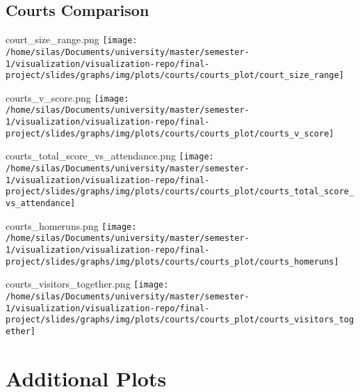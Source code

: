 \documentclass[pdf]{beamer}
\begin{document}
\subsection{Courts Comparison}
\begin{frame}{court\_size\_range.png}
	\centering
	\texttt{[image: /home/silas/Documents/university/master/semester-1/visualization/visualization-repo/final-project/slides/graphs/img/plots/courts/courts\_plot/court\_size\_range]}
\end{frame}
\begin{frame}{courts\_v\_score.png}
	\centering
	\texttt{[image: /home/silas/Documents/university/master/semester-1/visualization/visualization-repo/final-project/slides/graphs/img/plots/courts/courts\_plot/courts\_v\_score]}
\end{frame}
\begin{frame}{courts\_total\_score\_vs\_attendance.png}
	\centering
	\texttt{[image: /home/silas/Documents/university/master/semester-1/visualization/visualization-repo/final-project/slides/graphs/img/plots/courts/courts\_plot/courts\_total\_score\_vs\_attendance]}
\end{frame}
\begin{frame}{courts\_homeruns.png}
	\centering
	\texttt{[image: /home/silas/Documents/university/master/semester-1/visualization/visualization-repo/final-project/slides/graphs/img/plots/courts/courts\_plot/courts\_homeruns]}
\end{frame}
\begin{frame}{courts\_visitors\_together.png}
	\centering
	\texttt{[image: /home/silas/Documents/university/master/semester-1/visualization/visualization-repo/final-project/slides/graphs/img/plots/courts/courts\_plot/courts\_visitors\_together]}
\end{frame}
\section{Additional Plots}
\end{document}
